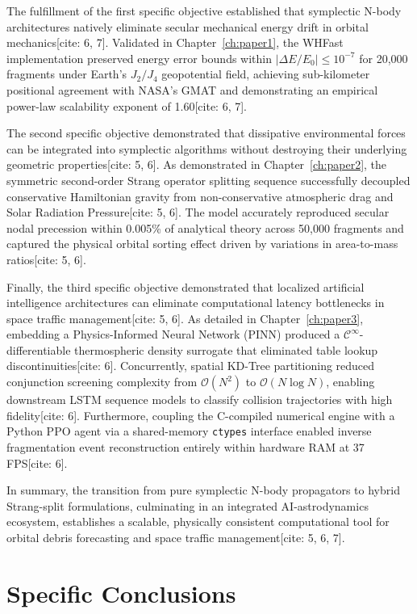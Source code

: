 \documentclass[12pt,letterpaper,twoside]{book}
\begin{document}
The fulfillment of the first specific objective established that symplectic N-body architectures natively eliminate secular mechanical energy drift in orbital mechanics[cite: 6, 7]. Validated in Chapter~\ref{ch:paper1}, the WHFast implementation preserved energy error bounds within $\vert{}\Delta E/E_0\vert{} \le 10^{-7}$ for 20,000 fragments under Earth's $J_2/J_4$ geopotential field, achieving sub-kilometer positional agreement with NASA's GMAT and demonstrating an empirical power-law scalability exponent of 1.60[cite: 6, 7].

The second specific objective demonstrated that dissipative environmental forces can be integrated into symplectic algorithms without destroying their underlying geometric properties[cite: 5, 6]. As demonstrated in Chapter~\ref{ch:paper2}, the symmetric second-order Strang operator splitting sequence successfully decoupled conservative Hamiltonian gravity from non-conservative atmospheric drag and Solar Radiation Pressure[cite: 5, 6]. The model accurately reproduced secular nodal precession within 0.005\% of analytical theory across 50,000 fragments and captured the physical orbital sorting effect driven by variations in area-to-mass ratios[cite: 5, 6].

Finally, the third specific objective demonstrated that localized artificial intelligence architectures can eliminate computational latency bottlenecks in space traffic management[cite: 5, 6]. As detailed in Chapter~\ref{ch:paper3}, embedding a Physics-Informed Neural Network (PINN) produced a $\mathcal{C}^\infty$-differentiable thermospheric density surrogate that eliminated table lookup discontinuities[cite: 6]. Concurrently, spatial KD-Tree partitioning reduced conjunction screening complexity from $\mathcal{O}(N^2)$ to $\mathcal{O}(N \log N)$, enabling downstream LSTM sequence models to classify collision trajectories with high fidelity[cite: 6]. Furthermore, coupling the C-compiled numerical engine with a Python PPO agent via a shared-memory \texttt{ctypes} interface enabled inverse fragmentation event reconstruction entirely within hardware RAM at 37 FPS[cite: 6].

In summary, the transition from pure symplectic N-body propagators to hybrid Strang-split formulations, culminating in an integrated AI-astrodynamics ecosystem, establishes a scalable, physically consistent computational tool for orbital debris forecasting and space traffic management[cite: 5, 6, 7].

\section{Specific Conclusions}
\end{document}
